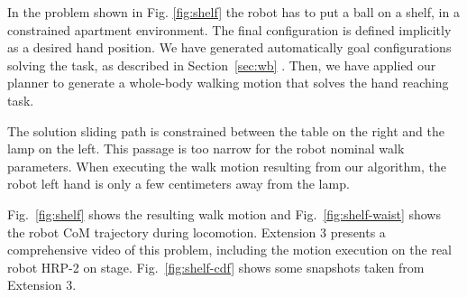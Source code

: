 \documentclass{article}
\begin{document}
In the problem shown in Fig. \ref{fig:shelf} the robot has to put a ball on a
shelf, in a constrained apartment environment. The final configuration is defined 
implicitly as a desired hand position. We have generated automatically goal configurations 
solving the task, as described in Section~\ref{sec:wb} . Then, we have
applied our planner to generate a whole-body walking motion that solves the hand reaching
task. 

The solution sliding path is constrained between the table on the right and the lamp
on the left. This passage is too narrow for the robot nominal walk parameters. 
When executing the walk motion resulting from our algorithm, the robot left hand
is only a few centimeters away from the lamp.

Fig.~\ref{fig:shelf} shows the resulting walk motion and Fig.~\ref{fig:shelf-waist} 
shows the robot CoM trajectory during locomotion. Extension 3 presents a 
comprehensive video of this problem, including the motion execution on
the real robot HRP-2 on stage. Fig.~\ref{fig:shelf-cdf} shows some snapshots 
taken from Extension 3.
\end{document}
